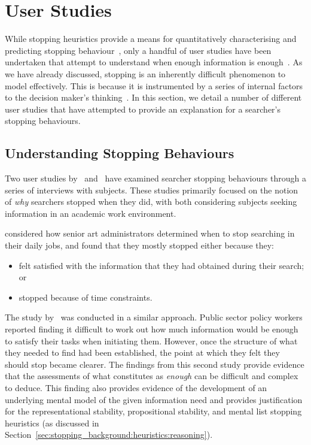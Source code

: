 \section{User Studies}\label{sec:stopping_background:user_studies}
While stopping heuristics provide a means for quantitatively characterising and predicting stopping behaviour~\citep{wu2014information_scent}, only a handful of user studies have been undertaken that attempt to understand when enough information is enough~\citep{zach2005enough_is_enough}. As we have already discussed, stopping is an inherently difficult phenomenon to model effectively. This is because it is instrumented by a series of internal factors to the decision maker's thinking~\citep{nickles1995judgment}. In this section, we detail a number of different user studies that have attempted to provide an explanation for a searcher's stopping behaviours.

\subsection{Understanding Stopping Behaviours}
Two user studies by~\cite{zach2005enough_is_enough} and~\cite{berryman2006defines} have examined searcher stopping behaviours through a series of interviews with subjects. These studies primarily focused on the notion of \emph{why} searchers stopped when they did, with both considering subjects seeking information in an academic work environment.

\cite{zach2005enough_is_enough} considered how senior art administrators determined when to stop searching in their daily jobs, and found that they mostly stopped either because they:

\begin{itemize}
    \item{felt satisfied with the information that they had obtained during their search; or}
    \item{stopped because of time constraints.}
\end{itemize}

The study by~\cite{berryman2006defines} was conducted in a similar approach. Public sector policy workers reported finding it difficult to work out how much information would be enough to satisfy their tasks when initiating them. However, once the structure of what they needed to find had been established, the point at which they felt they should stop became clearer. The findings from this second study provide evidence that the assessments of what constitutes as \emph{enough} can be difficult and complex to deduce. This finding also provides evidence of the development of an underlying mental model of the given information need and provides justification for the representational stability, propositional stability, and mental list stopping heuristics (as discussed in Section~\ref{sec:stopping_background:heuristics:reasoning}).


